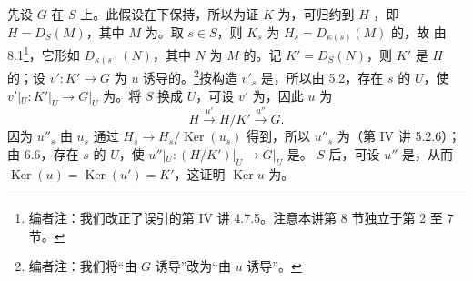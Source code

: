 先设 $G$ 在 $S$ 上。此假设在下保持，所以为证 $K$ 为，可归约到 $H$ ，即 $H=D_S(M)$，其中 $M$ 为。取 $s\in S$，则 $K_s$ 为 $H_s=D_{\kappa(s)}(M)$ 的，故
由 8.1\footnote{编者注：我们改正了误引的第 IV 讲 4.7.5。注意本讲第 8 节独立于第 2 至 7 节。}，它形如 $D_{\kappa(s)}(N)$，其中 $N$ 为 $M$ 的。记 $K'=D_S(N)$，则 $K'$ 是 $H$ 的；设 $v':K'\to G$ 为 $u$ 诱导的。\footnote{编者注：我们将“由 $G$ 诱导”改为“由 $u$ 诱导”。}按构造 $v'_s$ 是，所以由 5.2，存在 $s$ 的 $U$，使 $v'|_U:K'|_U\to G|_U$ 为。将 $S$ 换成 $U$，可设 $v'$ 为，因此 $u$ 为
\[H\xrightarrow{u'}H/K'\xrightarrow{u''}G.\]
因为 $u''_s$ 由 $u_s$ 通过 $H_s\to H_s/\operatorname{Ker}(u_s)$ 得到，所以 $u''_s$ 为（第 IV 讲 5.2.6）；由 6.6，存在 $s$ 的 $U$，使 $u''|_U:(H/K')|_U\to G|_U$ 是。 $S$ 后，可设 $u''$ 是，从而 $\operatorname{Ker}(u)=\operatorname{Ker}(u')=K'$，这证明 $\operatorname{Ker}u$ 为。

